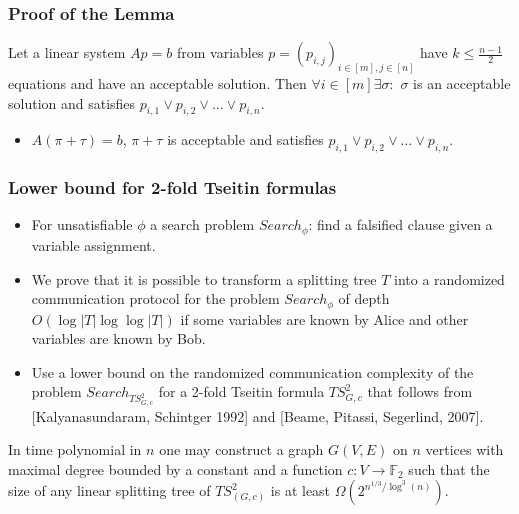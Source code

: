 \begin{frame}
    \frametitle{Proof of the Lemma}

    \mylem Let a linear system $Ap = b$ from variables
    $p = (p_{i, j})_{i \in [m], j \in [n]}$ have $k\le \frac{n-1}{2}$
    equations and have an acceptable solution. Then  $\forall i\in [m] \exists \sigma:$ 
    $\sigma$ is an acceptable solution and satisfies $p_{i, 1} \lor
    p_{i, 2} \lor \dots \lor p_{i,n}$.

	\begin{itemize}
		\pitem $1 \to 0$ can't violate the acceptability.
		\pitem Let $\pi$ be acceptable solution with the minimal number of 1's.
		\pitem $\pi$ contains at most $k$ ones.
			\begin{itemize}
				\pitem Variables with value $1$ in $\pi$: $p_{j_1}, p_{j_2}, \dots,
	                p_{j_{k + 1}}$ 
				\item $\exists \tau \neq 0: A \tau = 0$ and support of $\tau$ is in
		            $p_{j_1}, p_{j_2}, \dots, p_{j_{k + 1}}$. 
				\item $A(\pi + \tau) = b$, $\pi + \tau$ is acceptable.
			\end{itemize}
		\pitem $\pi$ has $k + 1$ empty holes with numbers $\ell_1, \ell_2, \dots,
    		\ell_{k + 1}$ 
		\pitem $\exists \tau \neq 0: A \tau = 0$ and support of $\tau$ is in
    		$p_{i, \ell_1}, p_{i, \ell_2}, \dots, p_{i, \ell_{k + 1}}$.
		\item $A(\pi + \tau) = b$, $\pi + \tau$ is acceptable and satisfies $p_{i, 1}
		    \lor p_{i, 2} \lor \dots \lor p_{i,n}$.
	\end{itemize}
\end{frame}



\begin{frame}
    \frametitle{Lower bound for 2-fold Tseitin formulas}

    \begin{itemize}
		\item For unsatisfiable $\phi$ a search problem $Search_\phi$: find a
		    falsified clause given a variable assignment.  
		\item We prove that it is possible to transform a splitting tree $T$ into a
		    randomized communication protocol for the problem $Search_\phi$ of depth
	        $O(\log |T| \log\log |T|)$ if some variables are known by Alice and other
	        variables are known by Bob.
		\item Use a lower bound on the randomized communication complexity of the
		    problem $Search_{TS^2_{G,c}}$ for a 2-fold Tseitin formula $TS^2_{G,c}$
            that follows from [Kalyanasundaram, Schintger 1992] and
            [Beame, Pitassi, Segerlind, 2007].
	\end{itemize}
	\pause
	\myth In time polynomial in $n$ one may construct a graph $G(V, E)$ on $n$
    vertices with maximal degree bounded by a constant and a function $c: V \to
    \mathbb{F}_2$ such that the size of any linear splitting tree of $TS^2_{(G,c)}$
    is at least $\Omega\left(2^{n^{1 / 3} / \log^3(n)} \right)$.
\end{frame}



